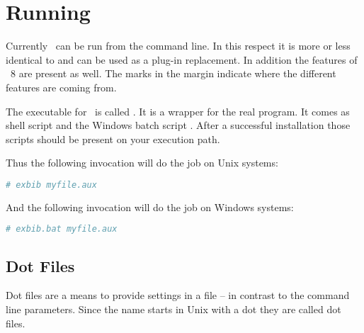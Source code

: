 

\section{Running \ExBib}

Currently \ExBib\ can be run from the command line. In this respect it
is more or less identical to \BibTeX{} and can be
used as a plug-in replacement. In addition the features of
\BibTeX~8 are present as well. The marks in
the margin indicate where the different features are coming from.

The executable for \ExBib\ is called . It is a wrapper
for the real program. It comes as shell script  and the
Windows batch script . After a successful installation
those scripts should be present on your execution path.

Thus the following invocation will do the job on Unix systems:
\begin{lstlisting}[language=sh]
# exbib myfile.aux
\end{lstlisting}

And the following invocation will do the job on Windows systems:
\begin{lstlisting}[language=sh]
# exbib.bat myfile.aux
\end{lstlisting}


\subsection{Dot Files}%
\label{sec:dot.files}%

Dot files are a means to provide settings in a file -- in contrast to
the command line parameters. Since the name starts in Unix
with a dot they are called dot files.

